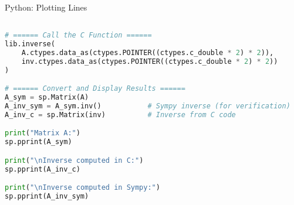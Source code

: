 \documentclass{beamer}
\begin{document}
\begin{frame}[fragile]{Python: Plotting Lines}
\begin{lstlisting}[language=Python, basicstyle=\ttfamily\scriptsize, keywordstyle=\color{blue}]

# ====== Call the C Function ======
lib.inverse(
    A.ctypes.data_as(ctypes.POINTER((ctypes.c_double * 2) * 2)),
    inv.ctypes.data_as(ctypes.POINTER((ctypes.c_double * 2) * 2))
)

# ====== Convert and Display Results ======
A_sym = sp.Matrix(A)
A_inv_sym = A_sym.inv()           # Sympy inverse (for verification)
A_inv_c = sp.Matrix(inv)          # Inverse from C code

print("Matrix A:")
sp.pprint(A_sym)

print("\nInverse computed in C:")
sp.pprint(A_inv_c)

print("\nInverse computed in Sympy:")
sp.pprint(A_inv_sym)
\end{lstlisting}
\end{frame}
\end{document}
